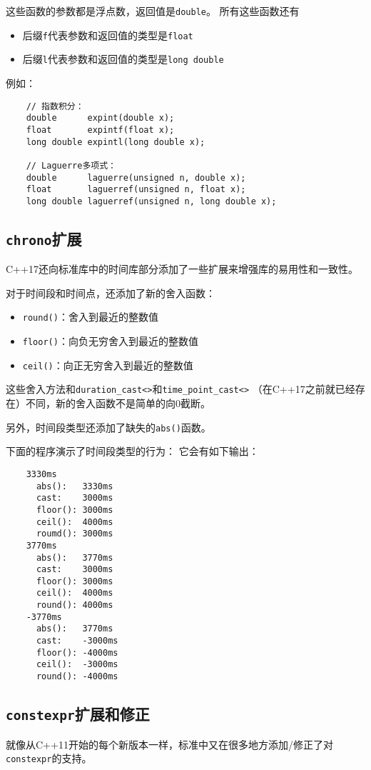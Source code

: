 这些函数的参数都是浮点数，返回值是\texttt{double}。
所有这些函数还有
\begin{itemize}
    \item 后缀\texttt{f}代表参数和返回值的类型是\texttt{float}
    \item 后缀\texttt{l}代表参数和返回值的类型是\texttt{long double}
\end{itemize}
例如：
\begin{lstlisting}
    // 指数积分：
    double      expint(double x);
    float       expintf(float x);
    long double expintl(long double x);

    // Laguerre多项式：
    double      laguerre(unsigned n, double x);
    float       laguerref(unsigned n, float x);
    long double laguerref(unsigned n, long double x);
\end{lstlisting}

\subsection{\texttt{chrono}扩展}
C++17还向标准库中的时间库部分添加了一些扩展来增强库的易用性和一致性。

对于时间段和时间点，还添加了新的舍入函数：
\begin{itemize}
    \item \texttt{round()}：舍入到最近的整数值
    \item \texttt{floor()}：向负无穷舍入到最近的整数值
    \item \texttt{ceil()}：向正无穷舍入到最近的整数值
\end{itemize}
这些舍入方法和\texttt{duration\_cast<>}和\texttt{time\_point\_cast<>}
（在C++17之前就已经存在）不同，新的舍入函数不是简单的向0截断。

另外，时间段类型还添加了缺失的\texttt{abs()}函数。

下面的程序演示了时间段类型的行为：
它会有如下输出：
\begin{lstlisting}
    3330ms
      abs():   3330ms
      cast:    3000ms
      floor(): 3000ms
      ceil():  4000ms
      roumd(): 3000ms
    3770ms
      abs():   3770ms
      cast:    3000ms
      floor(): 3000ms
      ceil():  4000ms
      round(): 4000ms
    -3770ms
      abs():   3770ms
      cast:    -3000ms
      floor(): -4000ms
      ceil():  -3000ms
      round(): -4000ms
\end{lstlisting}

\subsection{\texttt{constexpr}扩展和修正}\label{ch28.5}
就像从C++11开始的每个新版本一样，标准中又在很多地方添加/修正了对\texttt{constexpr}的支持。

